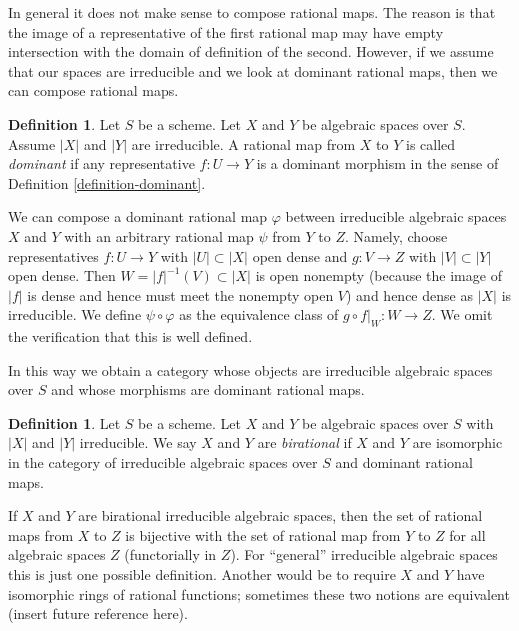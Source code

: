 \documentclass{stacks-project}
\theoremstyle{plain}
\theoremstyle{definition}
\newtheorem{definition}[subsection]{Definition}
\theoremstyle{remark}
\numberwithin{equation}{subsection}
\begin{document}
\noindent
In general it does not make sense to compose rational maps. The reason
is that the image of a representative of the first rational map may
have empty intersection with the domain of definition of the second.
However, if we assume that our spaces are irreducible and we look
at dominant rational maps, then we can compose rational maps.

\begin{definition}
\label{definition-dominant-rational}
Let $S$ be a scheme. Let $X$ and $Y$ be algebraic spaces over $S$.
Assume $|X|$ and $|Y|$ are irreducible. A rational map from $X$ to $Y$
is called {\it dominant} if any representative $f : U \to Y$ is a dominant
morphism in the sense of Definition \ref{definition-dominant}.
\end{definition}

\noindent
We can compose a dominant rational map
$\varphi$ between irreducible algebraic spaces
$X$ and $Y$ with an arbitrary rational
map $\psi$ from $Y$ to $Z$. Namely, choose
representatives $f : U \to Y$ with $|U| \subset |X|$ open dense
and $g : V \to Z$ with $|V| \subset |Y|$ open dense. Then
$W = |f|^{-1}(V) \subset |X|$ is open nonempty (because
the image of $|f|$ is dense and hence must meet the nonempty open $V$)
and hence dense as $|X|$ is irreducible. We define $\psi \circ \varphi$
as the equivalence class of $g \circ f|_W : W \to Z$. We omit the verification
that this is well defined.

\medskip\noindent
In this way we obtain a category whose objects are irreducible algebraic
spaces over $S$ and whose morphisms are dominant rational maps.

\begin{definition}
\label{definition-birational-spaces}
Let $S$ be a scheme. Let $X$ and $Y$ be algebraic spaces
over $S$ with $|X|$ and $|Y|$ irreducible.
We say $X$ and $Y$ are {\it birational} if $X$ and $Y$ are isomorphic
in the category of irreducible algebraic spaces over $S$
and dominant rational maps.
\end{definition}

\noindent
If $X$ and $Y$ are birational irreducible algebraic spaces,
then the set of rational maps from $X$ to $Z$ is bijective
with the set of rational map from $Y$ to $Z$ for all algebraic
spaces $Z$ (functorially in $Z$). For ``general'' irreducible algebraic spaces
this is just one possible definition. Another would be
to require $X$ and $Y$ have isomorphic rings of
rational functions; sometimes these two notions are equivalent
(insert future reference here).
\end{document}
